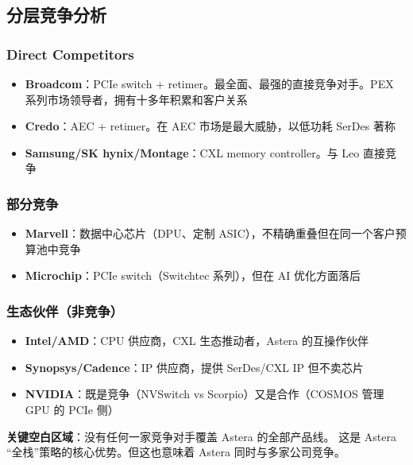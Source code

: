 \subsection{分层竞争分析}

\subsubsection{Direct Competitors}

\begin{itemize}
    \item \textbf{Broadcom}：PCIe switch + retimer。最全面、最强的直接竞争对手。PEX 系列市场领导者，拥有十多年积累和客户关系
    \item \textbf{Credo}：AEC + retimer。在 AEC 市场是最大威胁，以低功耗 SerDes 著称
    \item \textbf{Samsung/SK hynix/Montage}：CXL memory controller。与 Leo 直接竞争
\end{itemize}

\subsubsection{部分竞争}

\begin{itemize}
    \item \textbf{Marvell}：数据中心芯片（DPU、定制 ASIC），不精确重叠但在同一个客户预算池中竞争
    \item \textbf{Microchip}：PCIe switch（Switchtec 系列），但在 AI 优化方面落后
\end{itemize}

\subsubsection{生态伙伴（非竞争）}

\begin{itemize}
    \item \textbf{Intel/AMD}：CPU 供应商，CXL 生态推动者，Astera 的互操作伙伴
    \item \textbf{Synopsys/Cadence}：IP 供应商，提供 SerDes/CXL IP 但不卖芯片
    \item \textbf{NVIDIA}：既是竞争（NVSwitch vs Scorpio）又是合作（COSMOS 管理 GPU 的 PCIe 侧）
\end{itemize}

\textbf{关键空白区域}：没有任何一家竞争对手覆盖 Astera 的全部产品线。
这是 Astera ``全栈''策略的核心优势。但这也意味着 Astera 同时与多家公司竞争。

